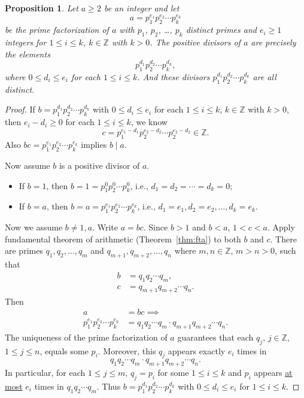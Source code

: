 \documentclass{amsbook}
\theoremstyle{plain}
\newtheorem{proposition}[theorem]{Proposition}
\theoremstyle{definition}
\theoremstyle{remark}
\numberwithin{equation}{chapter}
\numberwithin{figure}{chapter}
\begin{document}
\begin{proposition}\label{prop:prop1_day5}
  Let $a \geqslant 2$ be an integer and let
  \[
    a =  p_1^{e_1} p_2^{e_2} \cdots p_k^{e_k}
  \]
  be the prime factorization of $a$ with $p_1$, $p_2$, \dots, $p_k$ distinct primes and $e_i \geqslant 1$ integers for $1 \leqslant i \leqslant k$, $k \in \mathbb{Z}$ with $k > 0$. The positive divisors of $a$ are precisely the elements
  \[
    p_1^{d_1} p_2^{d_2} \cdots p_k^{d_k},
  \]
  where $0 \leqslant d_i \leqslant e_i$ for each $1 \leqslant i \leqslant k$. And these divisors $p_1^{d_1} p_2^{d_2} \cdots p_k^{d_k}$ are all distinct.
\end{proposition}
\begin{proof}
  If $b = p_1^{d_1} p_2^{d_2} \cdots p_k^{d_k}$ with $0 \leqslant d_i \leqslant e_i$ for each $1 \leqslant i \leqslant k$, $k \in \mathbb{Z}$ with $k > 0$, then $e_i - d_i \geqslant 0$ for each $1 \leqslant i \leqslant k$, we know 
\[
c = p_1^{e_1 - d_1} p_2^{e_2 - d_2} \cdots p_2^{e_2 - d_2} \in \mathbb{Z}.
\]
Also $bc = p_1^{e_1} p_2^{e_2} \cdots p_k^{e_k}$ implies $b \mid a$.

Now assume $b$ is a positive divisor of $a$.
\begin{itemize}
\item If $b = 1$, then $b = 1 = p_1^0 p_2^0 \cdots p_k^0$, i.e., $d_1 = d_2 = \cdots = d_k = 0$;
\item If $b = a$, then $b = a = p_1^{e_1} p_2^{e_2} \cdots p_k^{e_k}$, i.e., $d_1 = e_1, d_2 = e_2, \ldots, d_k = e_k$.
\end{itemize}

Now we assume $b \neq 1, a$. Write $a = bc$. Since $b > 1$ and $b < a$, $1 < c < a$. Apply fundamental theorem of arithmetic (Theorem~\ref{thm:fta}) to both $b$ and $c$. There are primes $q_1, q_2, \ldots, q_m$ and $q_{m+1}, q_{m+2}, \ldots, q_n$ where $m, n \in \mathbb{Z}$, $m > n> 0$, such that
\begin{align}
b &= q_1 q_2 \cdots q_m, \\
c &= q_{m+1} q_{m+2} \cdots q_n.
\end{align}
Then
\begin{align}
a &= bc \implies \\
p_1^{e_1} p_2^{e_2} \cdots p_k^{e_k} &= q_1 q_2 \cdots q_m \cdot q_{m+1} q_{m+2} \cdots q_n.
\end{align}
The uniqueness of the prime factorization of $a$ guarantees that each $q_j$, $j \in \mathbb{Z}$, $1 \leqslant j \leqslant n$, equals some $p_i$. Moreover, this $q_j$ appears exactly $e_i$ times in 
\[
q_1 q_2 \cdots q_m \cdot q_{m+1} q_{m+2} \cdots q_n.
\]
In particular, for each $1 \leqslant j \leqslant m$, $q_j = p_i$ for some $1 \leqslant i \leqslant k$ and $p_i$ appears \underline{at most} $e_i$ times in $q_1 q_2 \cdots q_m$. Thus $b = p_1^{d_1} p_2^{d_2} \cdots p_k^{d_k}$ with $0 \leqslant d_i \leqslant e_i$ for $1 \leqslant i \leqslant k$.
\end{proof}
\end{document}
